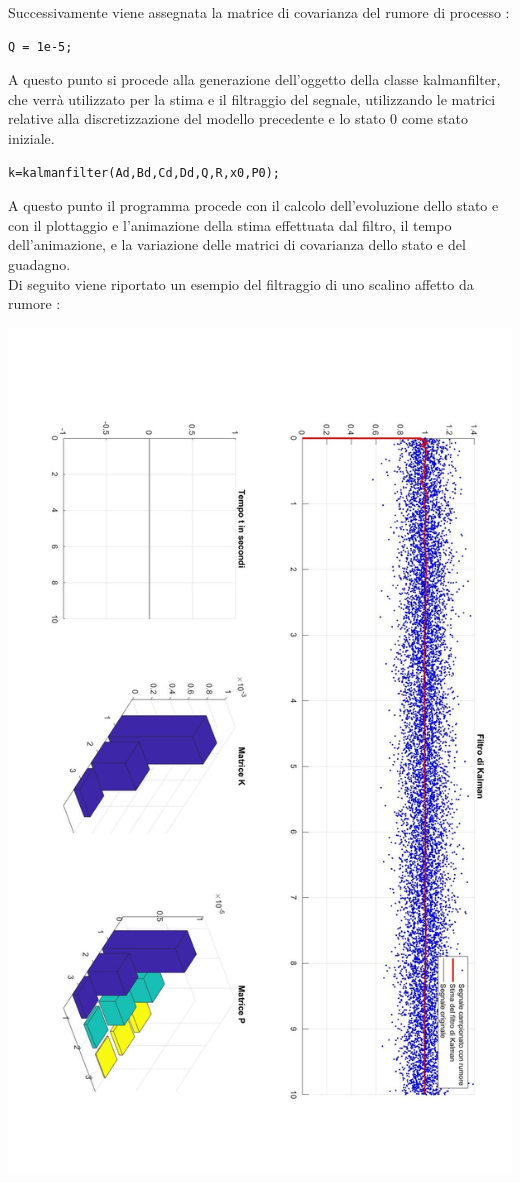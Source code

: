 Successivamente viene assegnata la matrice di covarianza del rumore di processo :
\begin{lstlisting}[frame=single]
Q = 1e-5;
\end{lstlisting}
A questo punto si procede alla generazione dell'oggetto della classe kalmanfilter, che verrà utilizzato per la stima e il filtraggio del segnale, utilizzando le matrici relative alla discretizzazione del modello precedente e lo stato 0 come stato iniziale.
\begin{lstlisting}[frame=single]
k=kalmanfilter(Ad,Bd,Cd,Dd,Q,R,x0,P0);
\end{lstlisting}

A questo punto il programma procede con il calcolo dell'evoluzione dello stato e con il plottaggio e l'animazione della stima effettuata dal filtro, il tempo dell'animazione, e la variazione delle matrici di  covarianza dello stato e del guadagno.\\
Di seguito viene riportato un esempio del filtraggio di uno scalino affetto da rumore :


\includegraphics[scale=.5]{immaginiMain/esempio.jpg} 




\newpage